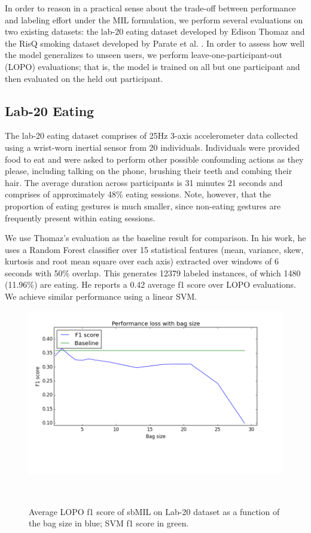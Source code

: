\documentclass{sigchi}
\begin{document}
In order to reason in a practical sense about the trade-off between performance and labeling effort under the MIL formulation, we perform several evaluations on two existing datasets: the lab-20 eating dataset developed by Edison Thomaz \cite{Thomaz:2015} and the RisQ smoking dataset developed by Parate et al. \cite{Parate:2014}. In order to assess how well the model generalizes to unseen users, we perform leave-one-participant-out (LOPO) evaluations; that is, the model is trained on all but one participant and then evaluated on the held out participant.

\subsection{Lab-20 Eating}

The lab-20 eating dataset comprises of 25Hz 3-axis accelerometer data collected using a wrist-worn inertial sensor from 20 individuals. Individuals were provided food to eat and were asked to perform other possible confounding actions as they please, including talking on the phone, brushing their teeth and combing their hair. The average duration across participants is 31 minutes 21 seconds and comprises of approximately 48\% eating sessions. Note, however, that the proportion of eating gestures is much smaller, since non-eating gestures are frequently present within eating sessions.

We use Thomaz's evaluation as the baseline result for comparison. In his work, he uses a Random Forest classifier over 15 statistical features (mean, variance, skew, kurtosis and root mean square over each axis) extracted over windows of 6 seconds with 50\% overlap. This generates 12379 labeled instances, of which 1480 (11.96\%) are eating. He reports a 0.42 average f1 score over LOPO evaluations. We achieve similar performance using a linear SVM.

\begin{figure}
\centering
  \includegraphics[width=0.9\columnwidth]{figures/sbMIL_bag_size2}
  \caption{Average LOPO f1 score of sbMIL on Lab-20 dataset as a function of the bag size in blue; SVM f1 score in green.}~\label{fig:figure1}
\end{figure}
\end{document}
